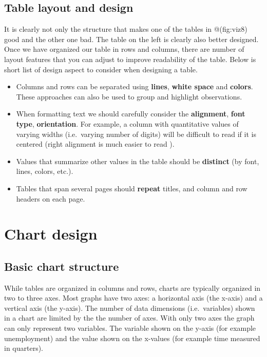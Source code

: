 \documentclass[]{book}
\begin{document}
\hypertarget{table-layout-and-design}{%
\subsection{Table layout and design}\label{table-layout-and-design}}

It is clearly not only the structure that makes one of the tables in @(fig:viz8) good and the other one bad. The table on the left is clearly also better designed. Once we have organized our table in rows and columns, there are number of layout features that you can adjust to improve readability of the table. Below is short list of design aspect to consider when designing a table.

\begin{itemize}
\item
  Columns and rows can be separated using \textbf{lines}, \textbf{white space} and \textbf{colors}. These approaches can also be used to group and highlight observations.
\item
  When formatting text we should carefully consider the \textbf{alignment}, \textbf{font type}, \textbf{orientation}. For example, a column with quantitative values of varying widths (i.e.~varying number of digits) will be difficult to read if it is centered (right alignment is much easier to read ).
\item
  Values that summarize other values in the table should be \textbf{distinct} (by font, lines, colors, etc.).
\item
  Tables that span several pages should \textbf{repeat} titles, and column and row headers on each page.
\end{itemize}

\hypertarget{chart-design}{%
\section{Chart design}\label{chart-design}}

\hypertarget{basic-chart-structure}{%
\subsection{Basic chart structure}\label{basic-chart-structure}}

While tables are organized in columns and rows, charts are typically organized in two to three axes. Most graphs have two axes: a horizontal axis (the x-axis) and a vertical axis (the y-axis). The number of data dimensions (i.e.~variables) shown in a chart are limited by the the number of axes. With only two axes the graph can only represent two variables. The variable shown on the y-axis (for example unemployment) and the value shown on the x-values (for example time measured in quarters).
\end{document}
